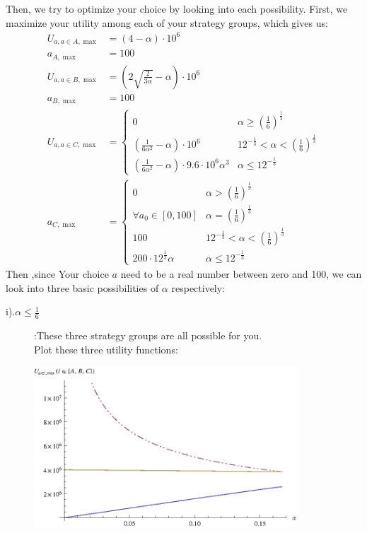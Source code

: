 \documentclass{article}
\begin{document}
\begin{description}
    Then, we try to optimize your choice by looking into each possibility.
    First, we maximize your utility among each of your strategy groups, which gives us:
    \begin{align}
      U_{a,a\in A,\max }&=(4-\alpha )\cdot 10^6\\
      a _{A,\max }&=100\\
      U_{a,a\in B,\max }&=\left(2\sqrt{\frac{2}{3\alpha }}-\alpha \right)\cdot 10^6\\
      a _{B,\max }&=100\\
      U_{a,a\in C,\max }&=\begin{cases}
 0 & \alpha \geq \left(\frac{1}{6}\right)^{\frac{1}{3}} \\
 \left(\frac{1}{6\alpha ^2}-\alpha \right)\cdot 10^6 & 12^{-\frac{1}{3}}<\alpha <\left(\frac{1}{6}\right)^{\frac{1}{3}} \\
 \left(\frac{1}{6\alpha ^2}-\alpha \right)\cdot 9.6\cdot 10^6\alpha ^3 & \alpha \leq 12^{-\frac{1}{3}}
\end{cases}\\
       a_{C,\max }&=\begin{cases}
 0 & \alpha >\left(\frac{1}{6}\right)^{\frac{1}{3}} \\
 \forall a_0\in [0,100] & \alpha =\left(\frac{1}{6}\right)^{\frac{1}{3}} \\
 100 & 12^{-\frac{1}{3}}<\alpha <\left(\frac{1}{6}\right)^{\frac{1}{3}} \\
 200\cdot 12^{\frac{1}{3}}\alpha  & \alpha \leq 12^{-\frac{1}{3}}
\end{cases}
    \end{align}
    Then ,since Your choice $a$ need to be a real number between zero and 100, we can look into three basic possibilities of $\alpha$ respectively:
    \begin{description}
      \item[i).$\alpha \leq \frac{1}{6}$]:These three strategy groups are all possible for you.\\
        Plot these three utility functions:
         \begin{center}
                    \includegraphics[angle=0, width=0.8\textwidth]{ECON3160A4P21}\\

\end{center}
\end{description}
\end{description}
\end{document}
